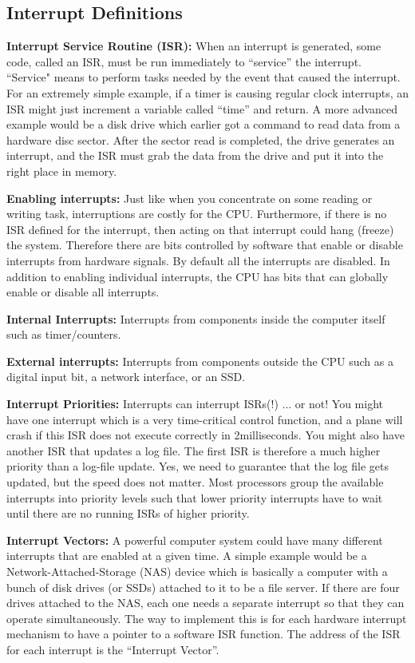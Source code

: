 \documentclass{article}	%
\begin{document}
\subsection{Interrupt Definitions}

{\bf Interrupt Service Routine (ISR):} When an interrupt is generated, some code, 
called an ISR, must be run immediately to “service” the interrupt.   ``Service"
means to perform tasks needed by the event that caused the interrupt.   For an 
extremely simple example, if a timer is causing regular clock interrupts, an ISR 
might just increment a variable called “time” and return.  A more advanced 
example would be a disk drive which earlier got a command to read data from a 
hardware disc sector.    After the sector read is completed, the drive generates 
an interrupt, and the ISR must grab the data from the drive and put it into the 
right place in memory. 

{\bf Enabling interrupts:  } Just like when you concentrate on some reading or 
writing task, interruptions are costly for the CPU.  Furthermore, if there is no 
ISR defined for the interrupt, then acting on that interrupt could hang (freeze) 
the system.   Therefore there are bits controlled by software that enable or 
disable interrupts from hardware signals.   By default all the interrupts are 
disabled.    In addition to enabling individual interrupts, the CPU has bits 
that can globally enable or disable all interrupts.

{\bf Internal Interrupts:} Interrupts from components inside the computer itself such as timer/counters. 

{\bf External interrupts: } Interrupts from components outside the CPU such as a digital input bit, a network interface, or an SSD.

{\bf Interrupt Priorities:}   Interrupts can interrupt ISRs(!)  ... or not!    You might have one interrupt which is a very time-critical control function, and a plane will crash if this ISR does not execute correctly in 2milliseconds.   You might also have another ISR that updates a log file.   The first ISR is therefore a much higher priority than a log-file update.   Yes, we need to guarantee that the log file gets updated, but the speed does not matter.    Most processors group the available interrupts into priority levels such that lower priority interrupts have to wait until there are no running ISRs of higher priority. 

{\bf Interrupt Vectors: }    A powerful computer system could have many different interrupts that are enabled at a given time.   A simple example would be a Network-Attached-Storage (NAS) device which is basically a computer with a bunch of disk drives (or SSDs) attached to it to be a file server.    If there are four drives attached to the NAS, each one needs a separate interrupt so that they can operate simultaneously.   The way to implement this is for each hardware interrupt mechanism to have a pointer to a software ISR function.    The address of the ISR for each interrupt is the “Interrupt Vector”.  
\end{document}
